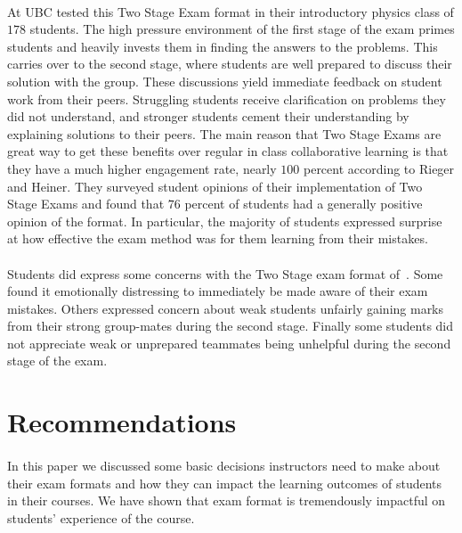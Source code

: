 \documentclass[12pt]{article}
\begin{document}
\paragraph{}
At UBC \cite{rieger2014examinations} tested this Two Stage Exam format in their introductory physics class of $178$ students. The high pressure environment of the first stage of the exam primes students and heavily invests them in finding the answers to the problems. This carries over to the second stage, where students are well prepared to discuss their solution with the group. These discussions yield immediate feedback on student work from their peers. Struggling students receive clarification on problems they did not understand, and stronger students cement their understanding by explaining solutions to their peers. The main reason that Two Stage Exams are great way to get these benefits over regular in class collaborative learning is that they have a much higher engagement rate, nearly $100$ percent according to Rieger and Heiner. They surveyed student opinions of their implementation of Two Stage Exams and found that $76$ percent of students had a generally positive opinion of the format. In particular, the majority of students expressed surprise at how effective the exam method was for them learning from their mistakes.
\paragraph{}
Students did express some concerns with the Two Stage exam format of~\cite{rieger2014examinations}. Some found it emotionally distressing to immediately be made aware of their exam mistakes. Others expressed concern about weak students unfairly gaining marks from their strong group-mates during the second stage. Finally some students did not appreciate weak or unprepared teammates being unhelpful during the second stage of the exam.


\section{Recommendations}\label{sec:recommendations}
\paragraph{}
In this paper we discussed some basic decisions instructors need to make about their exam formats and how they can impact the learning outcomes of students in their courses. We have shown that exam format is tremendously impactful on students' experience of the course.
\end{document}
